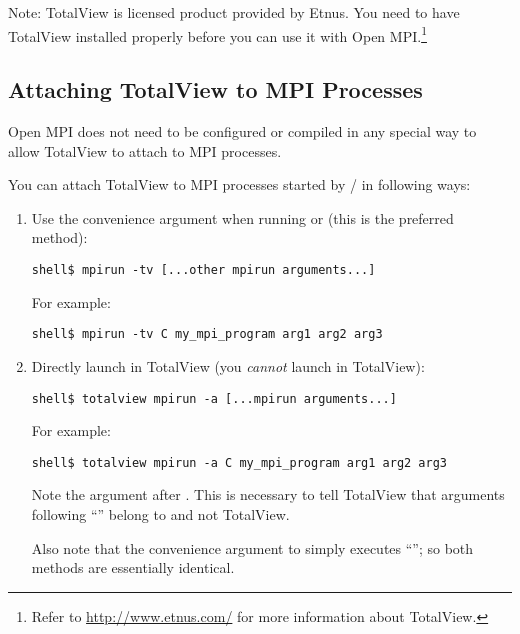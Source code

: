 Note: TotalView is licensed product provided by Etnus. You need to
have TotalView installed properly before you can use it with Open
MPI.\footnote{Refer to \url{http://www.etnus.com/} for more
  information about TotalView.}


\subsection{Attaching TotalView to MPI Processes}

Open MPI does not need to be configured or compiled in any special way
to allow TotalView to attach to MPI processes.

You can attach TotalView to MPI processes started by  /
 in following ways:

\begin{enumerate}
\item Use the  convenience argument when running
   or  (this is the preferred method):

  \lstset{style=lam-cmdline}
  \begin{lstlisting}
shell$ mpirun -tv [...other mpirun arguments...]
  \end{lstlisting}

  For example:
  
  \lstset{style=lam-cmdline}
  \begin{lstlisting}
shell$ mpirun -tv C my_mpi_program arg1 arg2 arg3
  \end{lstlisting}

\item Directly launch  in TotalView (you {\em cannot}
  launch  in TotalView):
  
  \lstset{style=lam-cmdline}
  \begin{lstlisting}
shell$ totalview mpirun -a [...mpirun arguments...]
  \end{lstlisting}
  
  For example:
  
  \lstset{style=lam-cmdline}
  \begin{lstlisting}
shell$ totalview mpirun -a C my_mpi_program arg1 arg2 arg3
  \end{lstlisting}
  
  Note the  argument after .  This is necessary
  to tell TotalView that arguments following ``'' belong to
   and not TotalView.
  
  Also note that the  convenience argument to 
  simply executes ``''; so both methods
  are essentially identical.
\end{enumerate}
        
